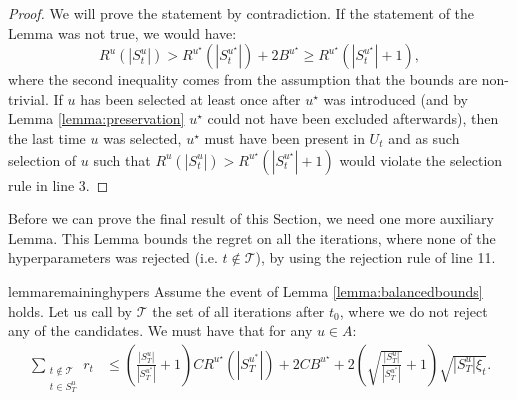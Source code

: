 \documentclass{article}
\theoremstyle{plain}
\theoremstyle{definition}
\theoremstyle{remark}
\theoremstyle{plain}
\begin{document}
\begin{proof}
    We will prove the statement by contradiction. If the statement of the Lemma was not true, we would have:
    \begin{equation*}
        R^{u}(|S_t^u|) > R^{u^\star}(|S_t^{u^\star}|) + 2B^{u^\star} \ge R^{u^\star}(|S_t^{u^\star}| + 1),
    \end{equation*}
    where the second inequality comes from the assumption that the bounds are non-trivial.  If $u$ has been selected at least once after $u^\star$ was introduced (and by Lemma \ref{lemma:preservation} $u^\star$  could not have been excluded afterwards), then the last time $u$ was selected, $u^\star$ must have been present in $U_t$ and as such selection of $u$ such that  $R^{u}(|S_t^u|) >  R^{u^\star}(|S_t^{u^\star}| + 1)$ would violate the selection rule in line 3.
\end{proof}
Before we can prove the final result of this Section, we need one more auxiliary Lemma. This Lemma bounds the regret on all the iterations, where none of the hyperparameters was rejected (i.e. $t \notin \mathcal{T}$), by using the rejection rule of line 11.
\begin{restatable}[]{lemma}{remaininghypers} \label{lemma:remaininghypers} Assume the event of Lemma \ref{lemma:balancedbounds} holds.
Let us call by $\mathcal{T}$ the set of all iterations after $t_0$, where we do not reject any of the candidates. We must have that for any $u \in A$:
\begin{align*}
\sum_{\substack{t \notin \mathcal{T} \\     t \in S_T^{u}}} r_t
 & \le \left(\frac{|S_T^{u}|}{|S_T^{u^*}|} + 1 \right) CR^{u^\star}(|S_T^{u^*}|) + 2CB^{u^\star} + 2\left(\sqrt{\frac{|S_T^{u}|}{|S_T^{u^*}|}} + 1\right)\sqrt{|S_T^{u}|\xi_t} .
\end{align*}
\end{restatable}
\end{document}
